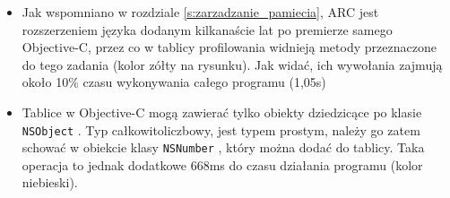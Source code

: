 \documentclass[mgr, shortabstract]{iithesis}
\newcommand{\objcinline}[1]{
    \texttt{#1}
}
\begin{document}
\begin{itemize}
    \item Jak wspomniano w rozdziale \ref{s:zarzadzanie_pamiecia}, ARC jest rozszerzeniem języka dodanym kilkanaście lat po premierze samego Objective-C, przez co w tablicy profilowania widnieją metody przeznaczone do tego zadania (kolor zółty na rysunku). Jak widać, ich wywołania zajmują około 10\% czasu wykonywania całego programu (1,05s)
    \item Tablice w Objective-C mogą zawierać tylko obiekty dziedzicące po klasie \objcinline{NSObject}. Typ całkowitoliczbowy, jest typem prostym, należy go zatem schować w obiekcie klasy \objcinline{NSNumber}, który można dodać do tablicy. Taka operacja to jednak dodatkowe 668ms do czasu działania programu (kolor niebieski).
\end{itemize}


\end{document}
